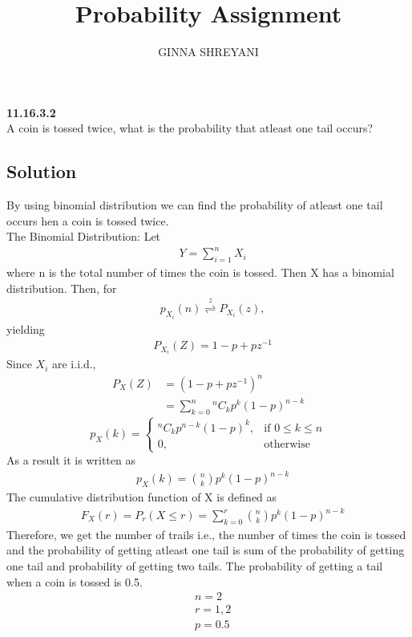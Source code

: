 \documentclass[10pt,twocolumn]{article}
\title{
Probability Assignment
}
\author{GINNA SHREYANI}
\date{}
\newcommand*{\Comb}[2]{{}^{#1}C_{#2}}%
\begin{document}
\maketitle


\textbf{11.16.3.2}\\
A coin is tossed twice, what is the probability that atleast one tail occurs?\\
\subsection*{Solution}
By using binomial distribution we can find the probability of atleast one tail occurs hen a coin is tossed twice.\\
The Binomial Distribution: Let
\begin{align}
	&Y = \sum_{i=1}^n X_i
     \label{eq-1}
\end{align}
where n is the total number of times the coin is tossed. Then X has a binomial distribution. Then, for
\begin{align}
	&p_{X_i}(n){\stackrel{z}{\rightleftharpoons}}P_{X_i}(z),
     \label{eq-2}
\end{align}
yielding
\begin{align}
	&P_{X_i}(Z)= 1-p+pz^{-1}
	\label{eq-3}
\end{align}
Since $X_i$ are i.i.d.,
\begin{align}
	P_X(Z)&=(1-p+pz^{-1})^n\\
	&=\sum_{k=0}^n{\Comb{n}{k}p^{k}(1-p)^{n-k}}
\end{align}
\[
	p_X(k)=
	\begin{cases}
		\Comb{n}{k}p^{n-k}(1-p)^k,& \text{if } 0\leq k\leq n\\
		0,& \text{otherwise}
	\end{cases}
\]
As a result it is written as
\begin{align}
	\label{eq-6}
	&p_X(k)=\binom nk p^{k}(1-p)^{n-k}
\end{align}
The cumulative distribution function of X is defined as
\begin{align}
	&F_X(r)=P_r(X\leq r) = \sum_{k=0}^r\binom nk p^{k}(1-p)^{n-k}
	\label{eq-7}
\end{align}
Therefore, we get the number of trails i.e., the number of times the coin is tossed and the probability of getting atleast one tail is sum of the probability of getting one tail and probability of getting two tails.
The probability of getting a tail when a coin is tossed is 0.5.
\begin{align*}
	&n = 2\\
	&r = 1,2\\
	&p = 0.5\\
\end{align*}
\end{document}
